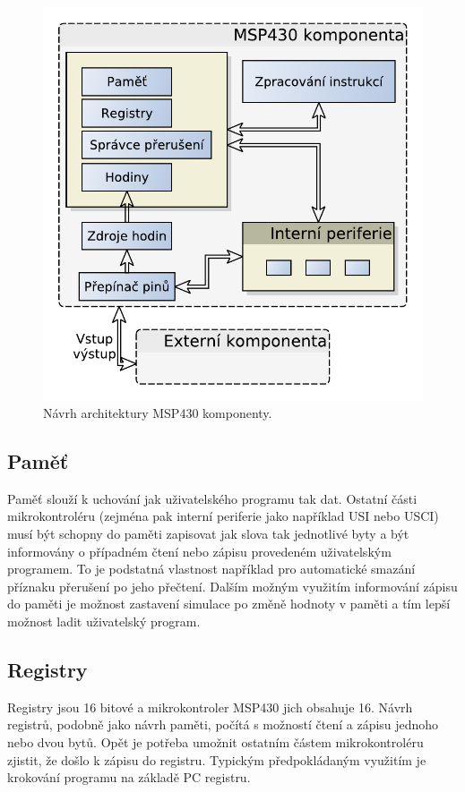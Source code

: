 \begin{figure}[h]
\centering
\includegraphics[trim=0cm 0cm 0cm 0cm, scale=0.7]{fig/msp430_arch}
\caption{Návrh architektury MSP430 komponenty.}
\label{fig:msp430_arch}
\end{figure}

\subsection{Paměť}

Paměť slouží k uchování jak uživatelského programu tak dat. Ostatní části mikrokontroléru (zejména pak interní periferie jako například USI nebo USCI) musí být schopny do paměti zapisovat jak slova tak jednotlivé byty a být informovány o případném čtení nebo zápisu provedeném uživatelským programem. To je podstatná vlastnost například pro automatické smazání příznaku přerušení po jeho přečtení. Dalším možným využitím informování zápisu do paměti je možnost zastavení simulace po změně hodnoty v paměti a tím lepší možnost ladit uživatelský program.

\subsection{Registry}

Registry jsou 16 bitové a mikrokontroler MSP430 jich obsahuje 16. Návrh registrů, podobně jako návrh paměti, počítá s možností čtení a zápisu jednoho nebo dvou bytů. Opět je potřeba umožnit ostatním částem mikrokontroléru zjistit, že došlo k zápisu do registru. Typickým předpokládaným využitím je krokování
programu na základě PC registru.

